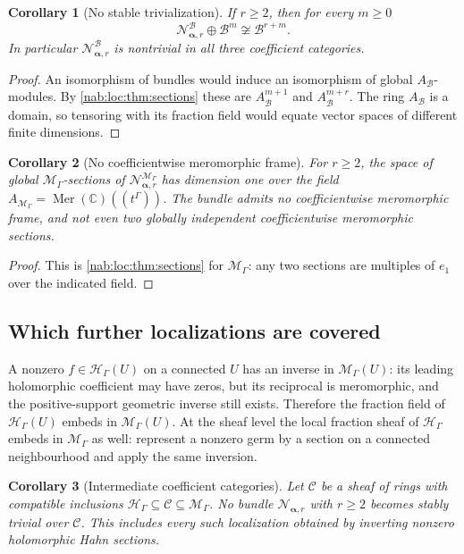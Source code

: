 \documentclass[11pt,letterpaper]{article}
\newtheorem{corollary}[corollary]{Corollary}
\theoremstyle{definition}
\theoremstyle{remark}
\newcommand{\C}{\mathbb C}
\newcommand{\HH}{\mathscr H_\Gamma}
\newcommand{\MM}{\mathscr M_\Gamma}
\newcommand{\BB}{\mathscr B}
\newcommand{\Aglob}{A_{\BB}}
\newcommand{\Mer}{\operatorname{Mer}}
\newcommand{\profile}{\boldsymbol\alpha}
\newcommand{\NN}[1]{\mathcal N_{\profile,#1}}
\numberwithin{equation}{section}
\begin{document}
\begin{corollary}[No stable trivialization]\label{nab:loc:cor:stable}
If $r\geq2$, then for every $m\geq0$
\[
 \NN r^{\BB}\oplus\BB^m\not\cong\BB^{r+m}.
\]
In particular $\NN r^{\BB}$ is nontrivial in all three coefficient
categories.
\end{corollary}

\begin{proof}
An isomorphism of bundles would induce an isomorphism of global
$\Aglob$-modules. By \cref{nab:loc:thm:sections} these are $\Aglob^{m+1}$ and
$\Aglob^{m+r}$. The ring $\Aglob$ is a domain, so tensoring with its fraction
field would equate vector spaces of different finite dimensions.
\end{proof}

\begin{corollary}[No coefficientwise meromorphic frame]\label{nab:loc:cor:meromorphic}
For $r\geq2$, the space of global $\MM$-sections of $\NN r^{\MM}$ has
dimension one over the field $A_{\MM}=\Mer(\C)((t^\Gamma))$. The bundle admits
no coefficientwise meromorphic frame, and not even two globally independent
coefficientwise meromorphic sections.
\end{corollary}

\begin{proof}
This is \cref{nab:loc:thm:sections} for $\MM$: any two sections are multiples
of $e_1$ over the indicated field.
\end{proof}

\subsection{Which further localizations are covered}

A nonzero $f\in\HH(U)$ on a connected $U$ has an inverse in $\MM(U)$: its
leading holomorphic coefficient may have zeros, but its reciprocal is
meromorphic, and the positive-support geometric inverse still exists.
Therefore the fraction field of $\HH(U)$ embeds in $\MM(U)$. At the sheaf level
the local fraction sheaf of $\HH$ embeds in $\MM$ as well: represent a nonzero
germ by a section on a connected neighbourhood and apply the same inversion.

\begin{corollary}[Intermediate coefficient categories]\label{nab:loc:cor:intermediate}
Let $\mathscr C$ be a sheaf of rings with compatible inclusions
$\HH\subseteq\mathscr C\subseteq\MM$. No bundle $\NN r$ with $r\geq2$ becomes
stably trivial over $\mathscr C$. This includes every such localization
obtained by inverting nonzero holomorphic Hahn sections.
\end{corollary}
\end{document}
